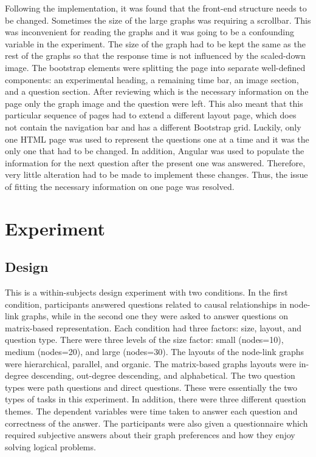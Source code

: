 \documentclass{l4proj}
\begin{document}
Following the implementation, it was found that the front-end structure needs to be changed. Sometimes the size of the large graphs was requiring a scrollbar. This was inconvenient for reading the graphs and it was going to be a confounding variable in the experiment. The size of  the graph had to be kept the same as the rest of the graphs so that the response time is not influenced by the scaled-down image. The bootstrap elements were splitting the page into separate well-defined components: an experimental heading, a remaining time bar, an image section, and a question section. After reviewing which is the necessary information on the page only the graph image and the question were left. This also meant that this particular sequence of pages had to extend a different layout page, which does not contain the navigation bar and has a different Bootstrap grid. Luckily, only one HTML page was used to represent the questions one at a time and it was the only one that had to be changed. In addition, Angular was used to populate the information for the next question after the present one was answered. Therefore, very little alteration had to be made to implement these changes. Thus, the issue of fitting the necessary information on one page was resolved.


\chapter{Experiment}
\label{chap:exp}

\section{Design}

This is a within-subjects design experiment with two conditions. In the first condition, participants answered questions related to causal relationships in node-link graphs, while in the second one they were asked to answer questions on matrix-based representation. Each condition had three factors: size, layout, and question type. There were three levels of the size factor: small (nodes=10), medium (nodes=20), and large (nodes=30). The layouts of the node-link graphs were hierarchical, parallel, and organic. The matrix-based graphs layouts were in-degree descending, out-degree descending, and alphabetical. The two question types were path questions and direct questions. These were essentially the two types of tasks in this experiment. In addition, there were three different question themes. The dependent variables were time taken to answer each question and correctness of the answer. The participants were also given a questionnaire which required subjective answers about their graph preferences and how they enjoy solving logical problems. 
\end{document}

